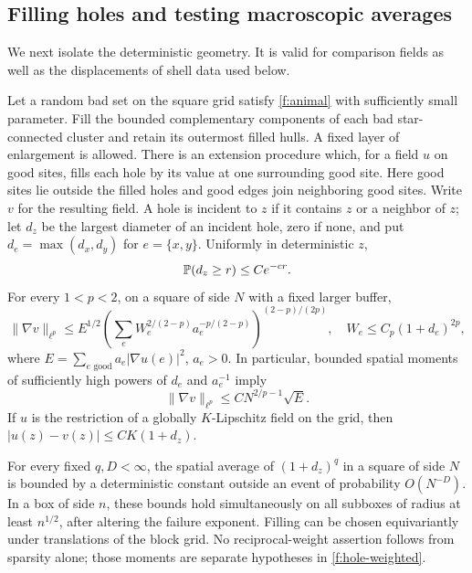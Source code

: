 \subsection{Filling holes and testing macroscopic averages}
We next isolate the deterministic geometry. It is valid for comparison
fields as well as the displacements of shell data used below.
\begin{lemma}\label{f:hole}
Let a random bad set on the square grid satisfy \eqref{f:animal} with
sufficiently small parameter. Fill the bounded complementary components
of each bad star-connected cluster and retain its outermost filled hulls.
A fixed layer of enlargement is allowed. There is an extension procedure
which, for a field $u$ on good sites, fills each hole by its value at one
surrounding good site. Here good sites lie outside the filled holes and
good edges join neighboring good sites. Write $v$ for the resulting field.
A hole is incident to $z$ if it contains $z$ or a neighbor of $z$;
let $d_z$ be the largest diameter of an incident hole, zero if none,
and put $d_e=\max(d_x,d_y)$ for $e=\{x,y\}$. Uniformly in deterministic $z$,
\begin{equation}\label{f:hole-tail}
 \mathbb P(d_z\ge r)\le Ce^{-cr}.
\end{equation}
For every $1<p<2$, on a square of side $N$ with a fixed larger buffer,
\begin{equation}\label{f:hole-weighted}
 \|\nabla v\|_{\ell^p}
 \le E^{1/2}
 \left(\sum_e W_e^{2/(2-p)}a_e^{-p/(2-p)}\right)^{(2-p)/(2p)},
 \quad W_e\le C_p(1+d_e)^{2p},
\end{equation}
where $E=\sum_{e\text{ good}}a_e|\nabla u(e)|^2$, $a_e>0$.
In particular, bounded spatial moments of sufficiently high powers of
$d_e$ and $a_e^{-1}$ imply
\begin{equation}\label{f:hole-scaled}
 \|\nabla v\|_{\ell^p}\le C N^{2/p-1}\sqrt E.
\end{equation}
If $u$ is the restriction of a globally $K$-Lipschitz field on the grid,
then $|u(z)-v(z)|\le CK(1+d_z)$.

For every fixed $q,D<\infty$, the spatial average of $(1+d_z)^q$ in a
square of side $N$ is bounded by a deterministic constant outside an event
of probability $O(N^{-D})$. In a box of side $n$, these bounds hold
simultaneously on all subboxes of radius at least $n^{1/2}$, after altering
the failure exponent. Filling can be chosen equivariantly under translations
of the block grid. No reciprocal-weight assertion follows from sparsity
alone; those moments are separate hypotheses in \eqref{f:hole-weighted}.
\end{lemma}
